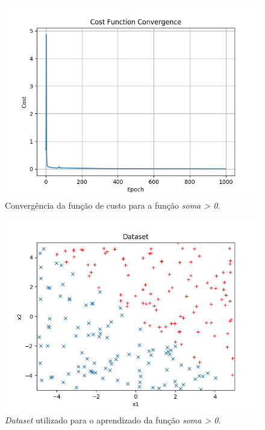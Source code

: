 \documentclass[conference]{IEEEtran}
\begin{document}
\begin{figure}[htbp]
\centering
\centerline{\includegraphics[scale=0.5]{imagens/sum_gt_zero/cost_function_convergence.png}}
\caption{Convergência da função de custo para a função \textit{soma > 0}.}
\label{sum_gt_zero/cost_function_convergence}
\end{figure}

\begin{figure}[htbp]
\centering
\centerline{\includegraphics[scale=0.5]{imagens/sum_gt_zero/dataset.png}}
\caption{\textit{Dataset} utilizado para o aprendizado da função \textit{soma > 0}.}
\label{sum_gt_zero/dataset}
\end{figure}
\end{document}
